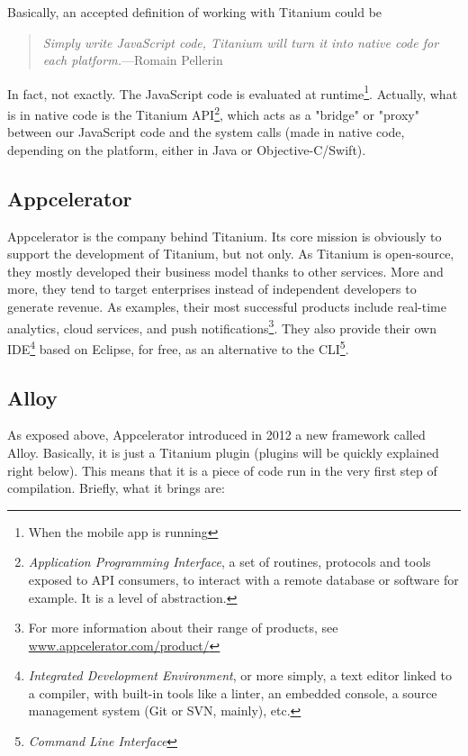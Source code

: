 \medskip

Basically, an accepted definition of working with Titanium could be

\begin{quote}
\textit{Simply write JavaScript code, Titanium will turn it into native code for each platform.}---Romain Pellerin
\end{quote}
In fact, not exactly. The JavaScript code is evaluated at runtime\footnote{When the mobile app is running}. Actually, what is in native code is the Titanium API\footnote{\textit{Application Programming Interface}, a set of routines, protocols and tools exposed to API consumers, to interact with a remote database or software for example. It is a level of abstraction.}, which acts as a "bridge" or "proxy" between our JavaScript code and the system calls (made in native code, depending on the platform, either in Java or Objective-C/Swift).

\subsection{Appcelerator}

Appcelerator is the company behind Titanium. Its core mission is obviously to support the development of Titanium, but not only. As Titanium is open-source, they mostly developed their business model thanks to other services. More and more, they tend to target enterprises instead of independent developers to generate revenue. As examples, their most successful products include real-time analytics, cloud services, and push notifications\footnote{For more information about their range of products, see \href{http://www.appcelerator.com/product/}{www.appcelerator.com/product/}}. They also provide their own IDE\footnote{\textit{Integrated Development Environment}, or more simply, a text editor linked to a compiler, with built-in tools like a linter, an embedded console, a source management system (Git or SVN, mainly), etc.} based on Eclipse, for free, as an alternative to the CLI\footnote{\textit{Command Line Interface}}.

\subsection{Alloy}

As exposed above, Appcelerator introduced in 2012 a new framework called Alloy. Basically, it is just a Titanium plugin (plugins will be quickly explained right below). This means that it is a piece of code run in the very first step of compilation. Briefly, what it brings are:

